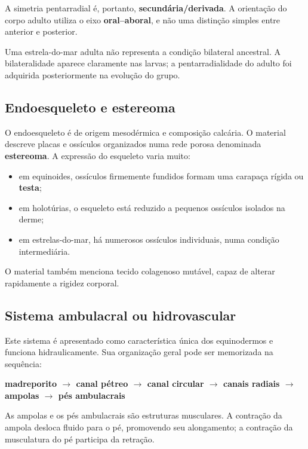 \documentclass[a4paper,12pt]{article}
\newcommand{\termo}[1]{\textbf{#1}}
\begin{document}
A simetria pentarradial é, portanto, \textbf{secundária/derivada}. A orientação do corpo adulto utiliza o eixo \termo{oral--aboral}, e não uma distinção simples entre anterior e posterior.

\begin{pontoprova}
Uma estrela-do-mar adulta não representa a condição bilateral ancestral. A bilateralidade aparece claramente nas larvas; a pentarradialidade do adulto foi adquirida posteriormente na evolução do grupo.
\end{pontoprova}

\subsection{Endoesqueleto e estereoma}

O endoesqueleto é de origem mesodérmica e composição calcária. O material descreve placas e ossículos organizados numa rede porosa denominada \termo{estereoma}. A expressão do esqueleto varia muito:

\begin{itemize}
  \item em equinoides, ossículos firmemente fundidos formam uma carapaça rígida ou \termo{testa};
  \item em holotúrias, o esqueleto está reduzido a pequenos ossículos isolados na derme;
  \item em estrelas-do-mar, há numerosos ossículos individuais, numa condição intermediária.
\end{itemize}

O material também menciona tecido colagenoso mutável, capaz de alterar rapidamente a rigidez corporal.

\subsection{Sistema ambulacral ou hidrovascular}

Este sistema é apresentado como característica única dos equinodermos e funciona hidraulicamente. Sua organização geral pode ser memorizada na sequência:

\begin{center}
\textbf{madreporito $\rightarrow$ canal pétreo $\rightarrow$ canal circular $\rightarrow$ canais radiais $\rightarrow$ ampolas $\rightarrow$ pés ambulacrais}
\end{center}

As ampolas e os pés ambulacrais são estruturas musculares. A contração da ampola desloca fluido para o pé, promovendo seu alongamento; a contração da musculatura do pé participa da retração.
\end{document}
